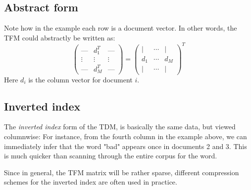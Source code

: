 \documentclass[12pt, a4paper]{article}
\numberwithin{equation}{section}
\begin{document}
\subsection{Abstract form}
Note how in the example each row is a document vector. In other words, the TFM could abstractly be written as:
\begin{equation}
\begin{pmatrix}
\textrm{---} & d_1^T & \textrm{---} \\
\vdots & \vdots & \vdots \\
\textrm{---} & d_M^T & \textrm{---}
\end{pmatrix}
=
\begin{pmatrix}
| & \cdots & | \\
d_1 & \cdots & d_M \\
| & \cdots & |
\end{pmatrix}^T
\end{equation}
Here $d_i$ is the column vector for document $i$.

\subsection{Inverted index}
The \textit{inverted index} form of the TDM, is basically the same data, but viewed columnwise: For instance, from the fourth column in the example above, we can immediately infer that the word "bad" appears once in documents 2 and 3. This is much quicker than scanning through the entire corpus for the word.

Since in general, the TFM matrix will be rather sparse, different compression schemes for the inverted index are often used in practice.
\end{document}

